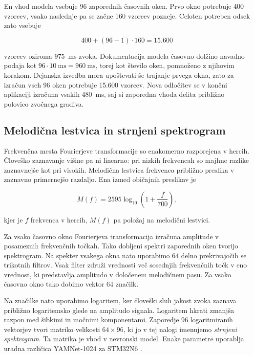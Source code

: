En vhod modela vsebuje 96 zaporednih časovnih oken. Prvo okno potrebuje 400
vzorcev, vsako naslednje pa se začne 160 vzorcev pozneje. Celoten potreben
odsek zato vsebuje

\begin{equation}
  400 + (96-1)\cdot160 = 15.600
\end{equation}

vzorcev oziroma \SI{975}{\milli\second} zvoka. Dokumentacija modela časovno
dolžino navadno podaja kot $96\cdot\SI{10}{\milli\second}=
\SI{960}{\milli\second}$, torej kot število oken, pomnoženo z njihovim korakom.
Dejanska izvedba mora upoštevati še trajanje prvega okna, zato za izračun vseh
96 oken potrebuje 15.600 vzorcev. Nova odločitev se v končni aplikaciji izračuna vsakih
\SI{480}{\milli\second}, saj si zaporedna vhoda delita približno polovico
zvočnega gradiva.

\subsection{Melodična lestvica in strnjeni spektrogram}

Frekvenčna mesta Fourierjeve transformacije so enakomerno razporejena v
hercih. Človeško zaznavanje višine pa ni linearno: pri nizkih frekvencah so
majhne razlike zaznavnejše kot pri visokih. Melodična lestvica frekvenco približno
preslika v zaznavno primernejšo razdaljo. Ena izmed običajnih preslikav je

\begin{equation}
  M(f) = 2595\log_{10}\left(1+\frac{f}{700}\right),
  \label{eq:mel}
\end{equation}

kjer je $f$ frekvenca v hercih, $M(f)$ pa položaj na melodični lestvici.

Za vsako časovno okno Fourierjeva transformacija izračuna amplitude v
posameznih frekvenčnih točkah. Tako dobljeni spektri zaporednih oken tvorijo
spektrogram. Na spekter vsakega okna nato uporabimo 64 delno prekrivajočih se
trikotnih filtrov. Vsak filter združi vrednosti več sosednjih frekvenčnih točk
v eno vrednost, ki predstavlja amplitudo v določenem melodičnem pasu. Za vsako
časovno okno tako dobimo vektor 64 značilk.

Na značilke nato uporabimo logaritem, ker človeški sluh jakost zvoka zaznava
približno logaritemsko glede na amplitudo signala. Logaritem hkrati zmanjša
razpon med šibkimi in močnimi komponentami. Zaporedje 96 logaritmiranih
vektorjev tvori matriko velikosti $64\times96$, ki jo v tej nalogi imenujemo
\emph{strnjeni spektrogram}. Ta matrika je vhod v nevronski model. Enake
parametre uporablja uradna različica YAMNet-1024 za STM32N6
\cite{ststm32aimodelzooyamnet}.

